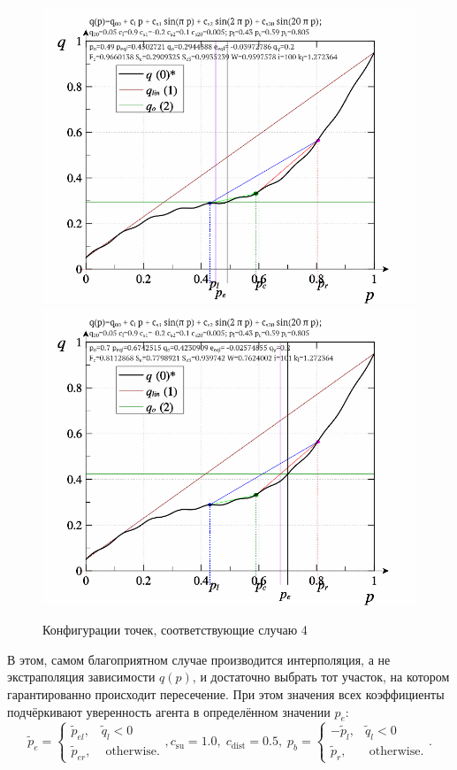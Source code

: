 \begin{figure}[htb!]
  \centerline{
    \includegraphics[width=49\TW]{p/pq_sin-p_pq_po=049.png}
    \hfill
    \includegraphics[width=49\TW]{p/pq_sin-p_pq_po=070.png}
  }
  \caption{Конфигурации точек, соответствующие случаю 4}
  \label{atu:f:pq_4}
\end{figure}

В этом, самом благоприятном случае
производится интерполяция,
а не экстраполяция зависимости $q(p)$,
и достаточно выбрать тот участок, на котором
гарантированно происходит пересечение.
При этом значения всех коэффициенты подчёркивают
уверенность агента в определённом значении $p_e$:
%
\begin{equation}
  \tilde{p}_e
  =
  \begin{cases}
    \tilde{p}_{el}, & \tilde{q}_l < 0
    \\
    \tilde{p}_{er}, & \text{ otherwise}.
  \end{cases}
  ,
  c_\mathrm{su} = 1.0, \;  c_\mathrm{dist} = 0.5,  \;
  p_b =
  \begin{cases}
    -\tilde{p}_l, & \tilde{q}_l < 0
    \\
    \tilde{p}_r, & \text{ otherwise}.
  \end{cases}.
  \label{atu:eq:pr_e4}
\end{equation}

